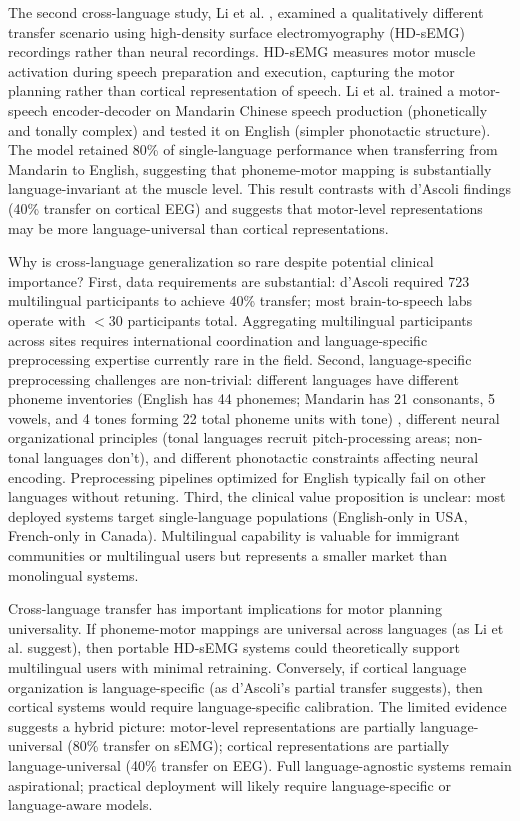 The second cross-language study, Li et al. \cite{Li2022}, examined a qualitatively different transfer scenario using high-density surface electromyography (HD-sEMG) recordings rather than neural recordings. HD-sEMG measures motor muscle activation during speech preparation and execution, capturing the motor planning rather than cortical representation of speech. Li et al. trained a motor-speech encoder-decoder on Mandarin Chinese speech production (phonetically and tonally complex) and tested it on English (simpler phonotactic structure). The model retained 80\% of single-language performance when transferring from Mandarin to English, suggesting that phoneme-motor mapping is substantially language-invariant at the muscle level. This result contrasts with d'Ascoli findings (40\% transfer on cortical EEG) and suggests that motor-level representations may be more language-universal than cortical representations.

Why is cross-language generalization so rare despite potential clinical importance? First, data requirements are substantial: d'Ascoli required 723 multilingual participants to achieve 40\% transfer; most brain-to-speech labs operate with $<$30 participants total. Aggregating multilingual participants across sites requires international coordination and language-specific preprocessing expertise currently rare in the field. Second, language-specific preprocessing challenges are non-trivial: different languages have different phoneme inventories (English has 44 phonemes; Mandarin has 21 consonants, 5 vowels, and 4 tones forming 22 total phoneme units with tone) \cite{Mandarin2020,Li2022}, different neural organizational principles (tonal languages recruit pitch-processing areas; non-tonal languages don't), and different phonotactic constraints affecting neural encoding. Preprocessing pipelines optimized for English typically fail on other languages without retuning. Third, the clinical value proposition is unclear: most deployed systems target single-language populations (English-only in USA, French-only in Canada). Multilingual capability is valuable for immigrant communities or multilingual users but represents a smaller market than monolingual systems.

Cross-language transfer has important implications for motor planning universality. If phoneme-motor mappings are universal across languages (as Li et al. suggest), then portable HD-sEMG systems could theoretically support multilingual users with minimal retraining. Conversely, if cortical language organization is language-specific (as d'Ascoli's partial transfer suggests), then cortical systems would require language-specific calibration. The limited evidence suggests a hybrid picture: motor-level representations are partially language-universal (80\% transfer on sEMG); cortical representations are partially language-universal (40\% transfer on EEG). Full language-agnostic systems remain aspirational; practical deployment will likely require language-specific or language-aware models.

